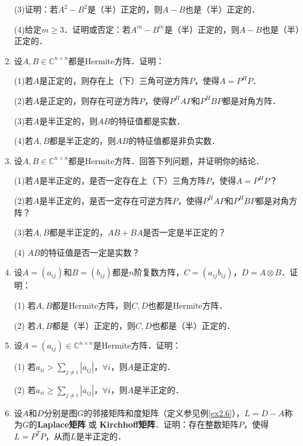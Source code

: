 \documentclass[a4paper,fontset=windows]{ctexbook}
\theoremstyle{definition}
\DeclareMathOperator{\diag}{diag}
\renewcommand{\ge}{\geqslant}
\begin{document}
\begin{enumerate}
(3)证明：若$A^2-B^2$是（半）正定的，则$A-B$也是（半）正定的．

(4)给定$m\ge 3$．证明或否定：若$A^m-B^m$是（半）正定的，则$A-B$也是（半）正定的．

\item 设$A,B\in\mathbb{C}^{n\times n}$都是Hermite方阵．证明：

(1)若$A$是正定的，则存在上（下）三角可逆方阵$P$，使得$A=P^HP$．

(2)若$A$是正定的，则存在可逆方阵$P$，使得$P^HAP$和$P^HBP$都是对角方阵．

(3)若$A$是半正定的，则$AB$的特征值都是实数．

(4)若$A,B$都是半正定的，则$AB$的特征值都是非负实数．

\item 设$A,B\in\mathbb{C}^{n\times n}$都是Hermite方阵．回答下列问题，并证明你的结论．

(1)若$A$是半正定的，是否一定存在上（下）三角方阵$P$，使得$A=P^HP$？

(2)若$A$是半正定的，是否一定存在可逆方阵$P$，使得$P^HAP$和$P^HBP$都是对角方阵？

(3)若$A,B$都是半正定的，$AB+BA$是否一定是半正定的？

(4) $AB$的特征值是否一定是实数？

\item 设$A=(a_{ij})$和$B=(b_{ij})$都是$n$阶复数方阵，$C=(a_{ij}b_{ij})$，$D=A\otimes B$．证明：

(1) 若$A,B$都是Hermite方阵，则$C,D$也都是Hermite方阵．

(2) 若$A,B$都是（半）正定的，则$C,D$也都是（半）正定的．

\item 设$A=(a_{ij})\in\mathbb{C}^{n\times n}$是Hermite方阵．证明：

(1) 若$a_{ii}>\sum\limits_{j\ne i}|a_{ij}|$，$\forall i$，则$A$是正定的．

(2) 若$a_{ii}\ge\sum\limits_{j\ne i}|a_{ij}|$，$\forall i$，则$A$是半正定的．

\item 设$A$和$D$分别是图$G$的邻接矩阵和度矩阵（定义参见例\ref{ex2.6}），$L=D-A$称为$G$的{\bf Laplace矩阵} 或 {\bf Kirchhoff矩阵}．证明：存在整数矩阵$P$，使得$L=P^TP$，从而$L$是半正定的．


\end{enumerate}
\end{document}

